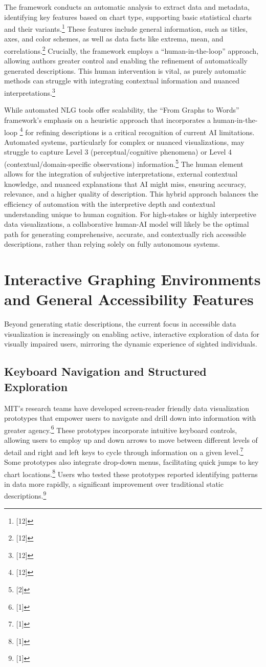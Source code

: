 The framework conducts an automatic analysis to extract data and metadata, identifying key features based on chart type, supporting basic statistical charts and their variants.\footnote{[12]} These features include general information, such as titles, axes, and color schemes, as well as data facts like extrema, mean, and correlations.\footnote{[12]} Crucially, the framework employs a ``human-in-the-loop'' approach, allowing authors greater control and enabling the refinement of automatically generated descriptions. This human intervention is vital, as purely automatic methods can struggle with integrating contextual information and nuanced interpretations.\footnote{[12]}

While automated NLG tools offer scalability, the ``From Graphs to Words'' framework's emphasis on a heuristic approach that incorporates a human-in-the-loop \footnote{[12]} for refining descriptions is a critical recognition of current AI limitations. Automated systems, particularly for complex or nuanced visualizations, may struggle to capture Level 3 (perceptual/cognitive phenomena) or Level 4 (contextual/domain-specific observations) information.\footnote{[2]} The human element allows for the integration of subjective interpretations, external contextual knowledge, and nuanced explanations that AI might miss, ensuring accuracy, relevance, and a higher quality of description. This hybrid approach balances the efficiency of automation with the interpretive depth and contextual understanding unique to human cognition. For high-stakes or highly interpretive data visualizations, a collaborative human-AI model will likely be the optimal path for generating comprehensive, accurate, and contextually rich accessible descriptions, rather than relying solely on fully autonomous systems.

\section{Interactive Graphing Environments and General Accessibility Features}
Beyond generating static descriptions, the current focus in accessible data visualization is increasingly on enabling active, interactive exploration of data for visually impaired users, mirroring the dynamic experience of sighted individuals.

\subsection{Keyboard Navigation and Structured Exploration}
MIT's research teams have developed screen-reader friendly data visualization prototypes that empower users to navigate and drill down into information with greater agency.\footnote{[1]} These prototypes incorporate intuitive keyboard controls, allowing users to employ up and down arrows to move between different levels of detail and right and left keys to cycle through information on a given level.\footnote{[1]} Some prototypes also integrate drop-down menus, facilitating quick jumps to key chart locations.\footnote{[1]} Users who tested these prototypes reported identifying patterns in data more rapidly, a significant improvement over traditional static descriptions.\footnote{[1]}


